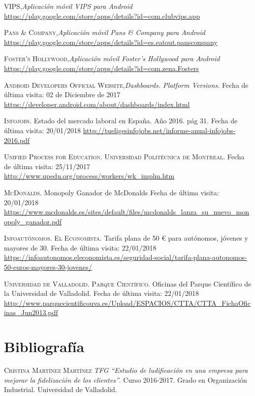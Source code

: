 \documentclass[twoside]{report}
\begin{document}
\begin{thebibliography}{a}
 \textsc{VIPS},\textit{Aplicación móvil VIPS para Android} \url{https://play.google.com/store/apps/details?id=com.clubvips.app}

 \textsc{Pans \& Company},\textit{Aplicación móvil Pans \& Company para Android} \url{https://play.google.com/store/apps/details?id=es.eatout.panscompany}

 \textsc{Foster's Hollywood},\textit{Aplicación móvil Foster's Hollywood para Android} \url{https://play.google.com/store/apps/details?id=com.zena.Fosters}

 \textsc{Android Developers Official Website},\textit{Dashboards. Platform Versions.} Fecha de última visita: 02 de Diciembre de 2017 \url{https://developer.android.com/about/dashboards/index.html}

 \textsc{Infojobs}. Estado del mercado laboral en España. Año 2016. pág 31. Fecha de última visita: 20/01/2018 \url{http://tueligesinfojobs.net/informe-anual-infojobs-2016.pdf} 

 \textsc{Unified Process for Education. Universidad Politécnica de Montreal}. Fecha de última visita: 25/11/2017 \url{http://www.upedu.org/process/workers/wk_implm.htm}

 \textsc{McDonalds}. Monopoly Ganador de McDonalds Fecha de última visita: 20/01/2018 \url{https://www.mcdonalds.es/sites/default/files/mcdonalds_lanza_su_nuevo_monopoly_ganador.pdf}

 \textsc{Infoautónomos. El Economista}. Tarifa plana de 50 \euro \hspace{0.1cm} para autónomos, jóvenes y mayores de 30. Fecha de última visita: 22/01/2018 \url{https://infoautonomos.eleconomista.es/seguridad-social/tarifa-plana-autonomos-50-euros-mayores-30-jovenes/}

 \textsc{Universidad de Valladolid. Parque Científico}. Oficinas del Parque Científico de la Universidad de Valladolid. Fecha de última visita: 22/01/2018 \url{http://www.parquecientificouva.es/Upload/ESPACIOS/CTTA/CTTA_FichaOficinas_Jun2013.pdf}



\section{Bibliografía}

 \textsc{Cristina Martínez Martínez} \textit{TFG “Estudio de ludificación en una empresa para mejorar la fidelización de los clientes”}. Curso 2016-2017. Grado en Organización Industrial. Universidad de Valladolid. 


\end{thebibliography}
\end{document}
